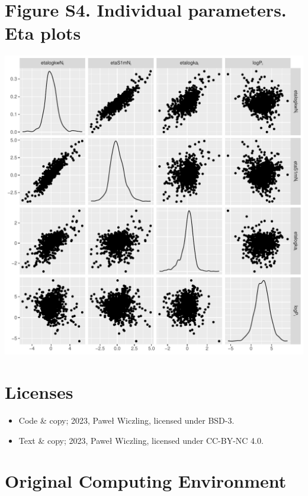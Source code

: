 \documentclass[
]{article}
\providecommand{\tightlist}{%
  \setlength{\itemsep}{0pt}\setlength{\parskip}{0pt}}\usepackage{longtable,booktabs,array}
\begin{document}
\newpage{}

\hypertarget{figure-s4.-individual-parameters.-eta-plots}{%
\section{Figure S4. Individual parameters. Eta
plots}\label{figure-s4.-individual-parameters.-eta-plots}}

\includegraphics{../deliv/figures/manuscript/supplement/eta.pdf}

\newpage{}

\hypertarget{licenses}{%
\section*{Licenses}\label{licenses}}

\begin{itemize}
\tightlist
\item
  Code \& copy; 2023, Paweł Wiczling, licensed under BSD-3.
\item
  Text \& copy; 2023, Paweł Wiczling, licensed under CC-BY-NC 4.0.
\end{itemize}

\hypertarget{original-computing-environment}{%
\section*{Original Computing
Environment}\label{original-computing-environment}}
\end{document}
